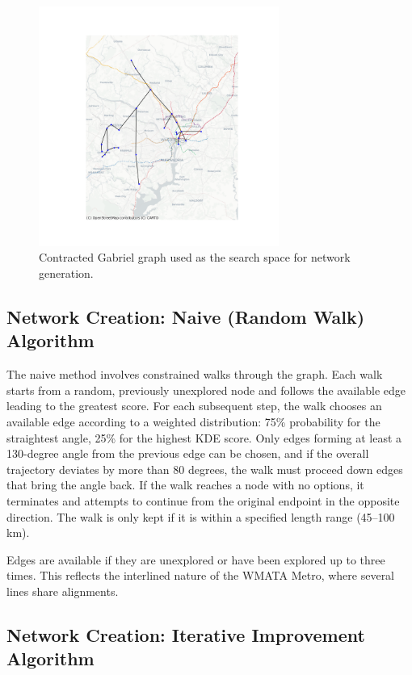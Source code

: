 \documentclass[manuscript]{acmart}
\begin{document}
\begin{figure}[h]
    \centering
    \includegraphics[width=0.7\textwidth]{img/network_map_contracted.png}
    \caption{Contracted Gabriel graph used as the search space for network generation.}
    \label{fig:contractedgraph}
\end{figure}

\subsection{Network Creation: Naive (Random Walk) Algorithm}

The naive method involves constrained walks through the graph. Each walk starts from a random, previously unexplored node and follows the available edge leading to the greatest score. For each subsequent step, the walk chooses an available edge according to a weighted distribution: 75\% probability for the straightest angle, 25\% for the highest KDE score. Only edges forming at least a 130-degree angle from the previous edge can be chosen, and if the overall trajectory deviates by more than 80 degrees, the walk must proceed down edges that bring the angle back. If the walk reaches a node with no options, it terminates and attempts to continue from the original endpoint in the opposite direction. The walk is only kept if it is within a specified length range (45--100 km).

Edges are available if they are unexplored or have been explored up to three times. This reflects the interlined nature of the WMATA Metro, where several lines share alignments.

\subsection{Network Creation: Iterative Improvement Algorithm}
\end{document}

